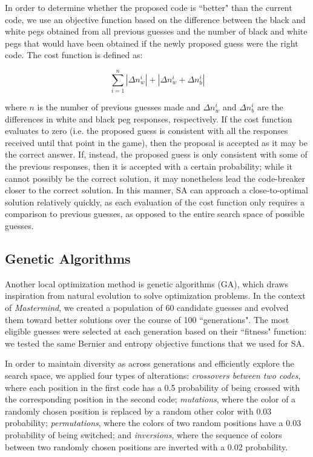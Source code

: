 \documentclass[11pt]{article}
\begin{document}
In order to determine whether the proposed code is ``better" than the current code, we use an objective function based on the difference between the black and white pegs obtained from all previous guesses and the number of black and white pegs that would have been obtained if the newly proposed guess were the right code. The cost function is defined as:

\[
\sum_{i=1}^n | \Delta n_w^i | + | \Delta n_w^i + \Delta n_b^i |
\]

\noindent where $n$ is the number of previous guesses made and $\Delta n_w^i $ and $\Delta n_b^i$ are the differences in white and black peg responses, respectively. If the cost function evaluates to zero (i.e. the proposed guess is consistent with all the responses received until that point in the game), then the proposal is accepted as it may be the correct answer. If, instead, the proposed guess is only consistent with some of the previous responses, then it is accepted with a certain probability; while it cannot possibly be the correct solution, it may nonetheless lead the code-breaker closer to the correct solution. In this manner, SA can approach a close-to-optimal solution relatively quickly, as each evaluation of the cost function only requires a comparison to previous guesses, as opposed to the entire search space of possible guesses.

\subsection{Genetic Algorithms}

Another local optimization method is genetic algorithms (GA), which draws inspiration from natural evolution to solve optimization problems. In the context of \textit{Mastermind}, we created a population of 60 candidate guesses and evolved them toward better solutions over the course of 100 ``generations". The most eligible guesses were selected at each generation based on their ``fitness" function: we tested the same Bernier and entropy objective functions that we used for SA.

\newpage

In order to maintain diversity as across generations and efficiently explore the search space, we applied four types of alterations: \textit{crossovers between two codes}, where each position in the first code has a 0.5 probability of being crossed with the corresponding position in the second code; \textit{mutations}, where the color of a randomly chosen position is replaced by a random other color with 0.03 probability; \textit{permutations}, where the colors of two random positions have a 0.03 probability of being switched; and \textit{inversions}, where the sequence of colors between two randomly chosen positions are inverted with a 0.02 probability.
\end{document}
